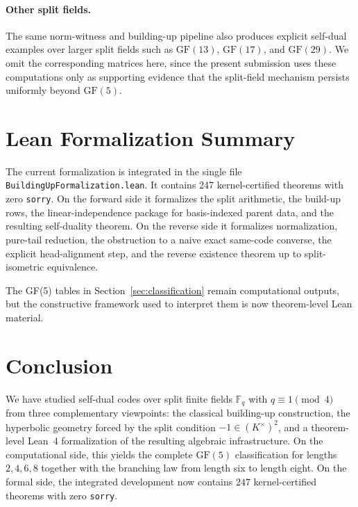 \documentclass[12pt]{article}
\newcommand{\F}{\mathbb{F}}
\newcommand{\GF}[1]{\ensuremath{\mathrm{GF}(#1)}}
\begin{document}
\paragraph{Other split fields.}
The same norm-witness and building-up pipeline also produces explicit self-dual examples over larger split fields such as $\GF{13}$, $\GF{17}$, and $\GF{29}$. We omit the corresponding matrices here, since the present submission uses these computations only as supporting evidence that the split-field mechanism persists uniformly beyond $\GF{5}$.

\section{Lean Formalization Summary}
\label{sec:lean}

The current formalization is integrated in the single file \texttt{BuildingUpFormalization.lean}. It contains 247 kernel-certified theorems with zero \texttt{sorry}. On the forward side it formalizes the split arithmetic, the build-up rows, the linear-independence package for basis-indexed parent data, and the resulting self-duality theorem. On the reverse side it formalizes normalization, pure-tail reduction, the obstruction to a naive exact same-code converse, the explicit head-alignment step, and the reverse existence theorem up to split-isometric equivalence.

The GF(5) tables in Section~\ref{sec:classification} remain computational outputs, but the constructive framework used to interpret them is now theorem-level Lean material.

\section{Conclusion}
\label{sec:conclusion}

We have studied self-dual codes over split finite fields $\F_q$ with $q\equiv 1 \pmod 4$ from three complementary viewpoints: the classical building-up construction, the hyperbolic geometry forced by the split condition $-1\in (K^\times)^2$, and a theorem-level Lean~4 formalization of the resulting algebraic infrastructure. On the computational side, this yields the complete $\GF{5}$ classification for lengths $2,4,6,8$ together with the branching law from length six to length eight. On the formal side, the integrated development now contains $247$ kernel-certified theorems with zero \texttt{sorry}.
\end{document}
